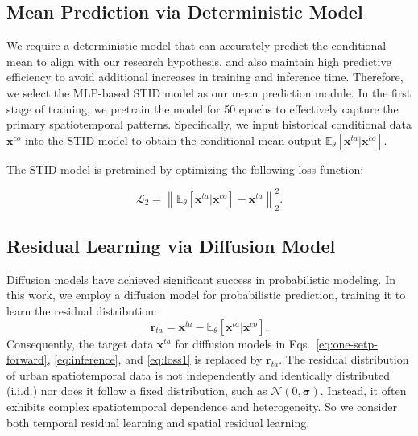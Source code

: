 \subsection{Mean Prediction via Deterministic Model}

We require a deterministic model that can accurately predict the conditional mean to align with our research hypothesis, and also maintain high predictive efficiency to avoid additional increases in training and inference time. Therefore, we select the MLP-based STID model as our mean prediction module.
In the first stage of training, we pretrain the model for 50 epochs to effectively capture the primary spatiotemporal patterns. Specifically, we input historical conditional data \(\mathbf{x}^{co}\) into the STID model to obtain the conditional mean output \(\mathbb{E}_{\theta}[\mathbf{x}^{ta}|\mathbf{x}^{co}]\).

The STID model is pretrained by optimizing the following loss function:

\begin{equation}
\label{eq:loss2}
   \mathcal{L}_{2}  = \left\| \mathbb{E}_{\theta}[\mathbf{x}^{ta}|\mathbf{x}^{co}] - \mathbf{x}^{ta} \right\|_2^2 .
\end{equation}

\subsection{Residual Learning via Diffusion Model}
Diffusion models have achieved significant success in probabilistic modeling. In this work, we employ a diffusion model for probabilistic prediction, training it to learn the residual distribution:
\begin{equation}
\label{eq:one-setp-forward}
    \mathbf{r}_{ta}=\mathbf{x}^{ta}-\mathbb{E}_{\theta}[\mathbf{x}^{ta}|\mathbf{x}^{co}].
\end{equation}
Consequently, the target data \(\mathbf{x}^{ta}\) for diffusion models in Eqs.~\eqref{eq:one-setp-forward}, \eqref{eq:inference}, and \eqref{eq:loss1} is replaced by \(\mathbf{r}_{ta}\).
The residual distribution of urban spatiotemporal data is not independently and identically distributed (i.i.d.) nor does it follow a fixed distribution, such as \(\mathcal{N}(0, \mathbf{\sigma})\). Instead, it often exhibits complex spatiotemporal dependence and heterogeneity. So we consider both temporal residual learning and spatial residual learning. 




